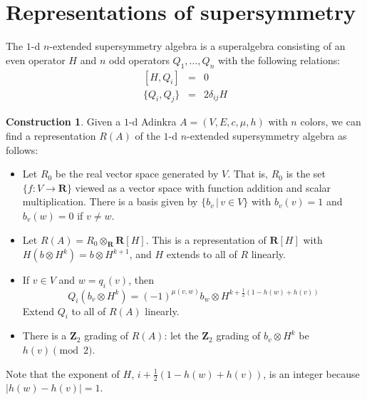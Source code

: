 \documentclass[12pt,twoside,singlespace]{article}
\numberwithin{equation}{section}
\theoremstyle{definition}
\newtheorem{construction}[equation]{Construction}
\newcommand{\ZZ}{\mathbf{Z}}
\newcommand{\RR}{\mathbf{R}}
\begin{document}
\appendix

\section{Representations of supersymmetry}
\label{app:repn}
The $1$-d $n$-extended supersymmetry algebra is a superalgebra consisting of an even operator $H$ and $n$ odd operators $Q_1, \ldots, Q_n$ with the following relations:
\begin{eqnarray}
\label{eqn:susy1d1}
[H,Q_i]&=&0\\
\label{eqn:susy1d2}
\{Q_i,Q_j\}&=&2\delta_{ij}H
\end{eqnarray}

\begin{construction}
\label{cons:susy1d}
Given a $1$-d Adinkra $A=(V,E,c,\mu,h)$ with $n$ colors, we can find a representation $R(A)$ of the $1$-d $n$-extended supersymmetry algebra as follows:
\begin{itemize}
\item Let $R_0$ be the real vector space generated by $V$.  That is, $R_0$ is the set $\{f:V\to \RR\}$ viewed as a vector space with function addition and scalar multiplication.  There is a basis given by $\{b_v\,|\,v\in V\}$ with $b_v(v)=1$ and $b_v(w)=0$ if $v\not=w$.
\item Let $R(A)=R_0\otimes_\RR \RR[H]$.  This is a representation of $\RR[H]$ with $H(b\otimes H^k)=b\otimes H^{k+1}$, and $H$ extends to all of $R$ linearly.
\item If $v\in V$ and $w=q_i(v)$, then
\[Q_i(b_v\otimes H^k)=(-1)^{\mu(v,w)} b_w\otimes H^{k+\frac12(1-h(w)+h(v))}\]
Extend $Q_i$ to all of $R(A)$ linearly.
\item There is a $\ZZ_2$ grading of $R(A)$: let the $\ZZ_2$ grading of $b_v\otimes H^k$ be $h(v)\pmod{2}$.
\end{itemize}
\end{construction}
Note that the exponent of $H$, $i+\frac12(1-h(w)+h(v))$, is an integer because $|h(w)-h(v)|=1$.
\end{document}
